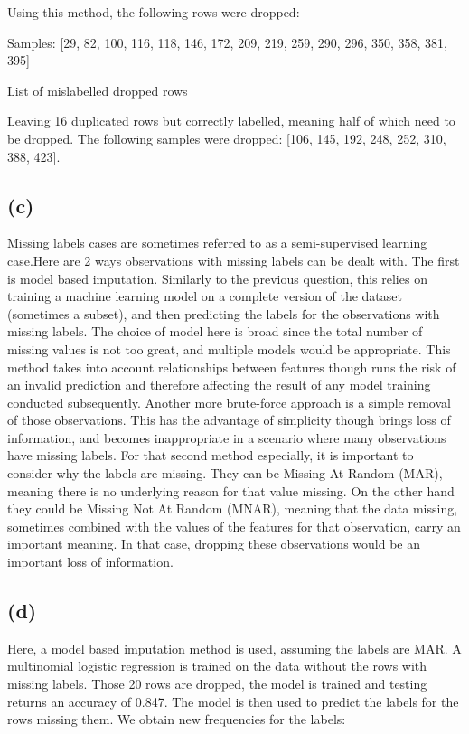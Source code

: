 \documentclass[12pt]{report} %
\begin{document}
Using this method, the following rows were dropped:

\begin{table}[h]
    \centering
    Samples: [29, 82, 100, 116, 118, 146, 172, 209, 219, 259, 290, 296, 350, 358, 381, 395]
    \caption{List of mislabelled dropped rows}
\end{table}

Leaving 16 duplicated rows but correctly labelled, meaning half of which need to be dropped. The following samples were dropped: [106, 145, 192, 248, 252, 310, 388, 423]. 

\subsection*{(c)}

Missing labels cases are sometimes referred to as a semi-supervised learning case\cite[p. 24]{james2013introduction}.Here are 2 ways observations with missing labels can be dealt with. The first is model based imputation. Similarly to the previous question, this relies on training a machine learning model on a complete version of the dataset (sometimes a subset), and then predicting the labels for the observations with missing labels. The choice of model here is broad since the total number of missing values is not too great, and multiple models would be appropriate. This method takes into account relationships between features though runs the risk of an invalid prediction and therefore affecting the result of any model training conducted subsequently. Another more brute-force approach is a simple removal of those observations. This has the advantage of simplicity though brings loss of information, and becomes inappropriate in a scenario where many observations have missing labels. For that second method especially, it is important to consider why the labels are missing. They can be Missing At Random (MAR), meaning there is no underlying reason for that value missing. On the other hand they could be Missing Not At Random (MNAR), meaning that the data missing, sometimes combined with the values of the features for that observation, carry an important meaning. In that case, dropping these observations would be an important loss of information\cite[pp. 515-516]{james2013introduction}.

\subsection*{(d)}

Here, a model based imputation method is used, assuming the labels are MAR. A multinomial logistic regression is trained on the data without the rows with missing labels. Those 20 rows are dropped, the model is trained and testing returns an accuracy of 0.847. The model is then used to predict the labels for the rows missing them. We obtain new frequencies for the labels: 
\end{document}
